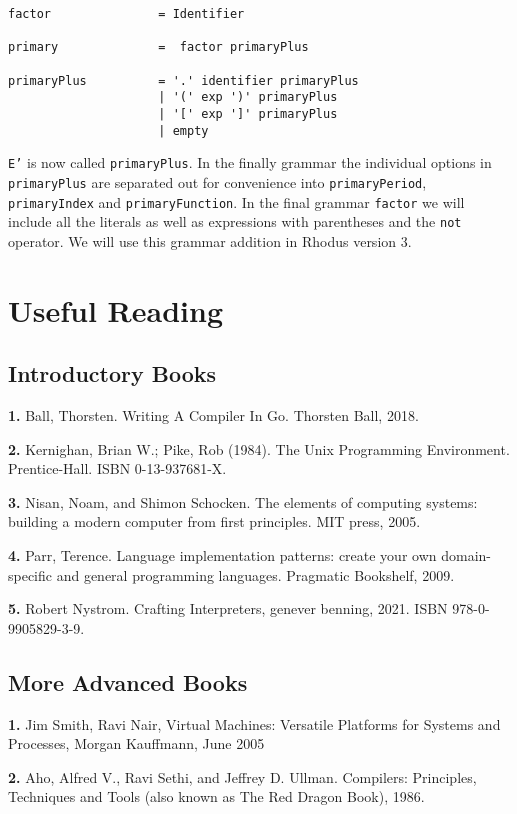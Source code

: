 {\footnotesize
\begin{verbatim}
factor               = Identifier

primary              =  factor primaryPlus

primaryPlus          = '.' identifier primaryPlus
                     | '(' exp ')' primaryPlus
                     | '[' exp ']' primaryPlus
                     | empty
\end{verbatim} }

{\tt E'} is now called {\tt primaryPlus}. In the finally grammar the individual options in {\tt primaryPlus} are separated out for convenience into {\tt primaryPeriod}, {\tt primaryIndex} and {\tt primaryFunction}. In the final grammar {\tt factor} we will include all the literals as well as expressions with parentheses and the {\tt not} operator. We will use this grammar addition in Rhodus version 3.

\section{Useful Reading}

\subsection{Introductory Books}

{\bf 1.} Ball, Thorsten. Writing A Compiler In Go. Thorsten Ball, 2018.

{\bf 2.} Kernighan, Brian W.; Pike, Rob (1984). The Unix Programming Environment. Prentice-Hall. ISBN 0-13-937681-X.

{\bf 3.} Nisan, Noam, and Shimon Schocken. The elements of computing systems: building a modern computer from first principles. MIT press, 2005.

{\bf 4.} Parr, Terence. Language implementation patterns: create your own domain-specific and general programming languages. Pragmatic Bookshelf, 2009.

{\bf 5.} Robert Nystrom. Crafting Interpreters, genever benning, 2021. ISBN 978-0-9905829-3-9.

\subsection{More Advanced Books}

{\bf 1.} Jim Smith, Ravi Nair, Virtual Machines: Versatile Platforms for Systems and Processes, Morgan Kauffmann, June 2005

{\bf 2.} Aho, Alfred V., Ravi Sethi, and Jeffrey D. Ullman. Compilers: Principles, Techniques and Tools (also known as The Red Dragon Book), 1986.

